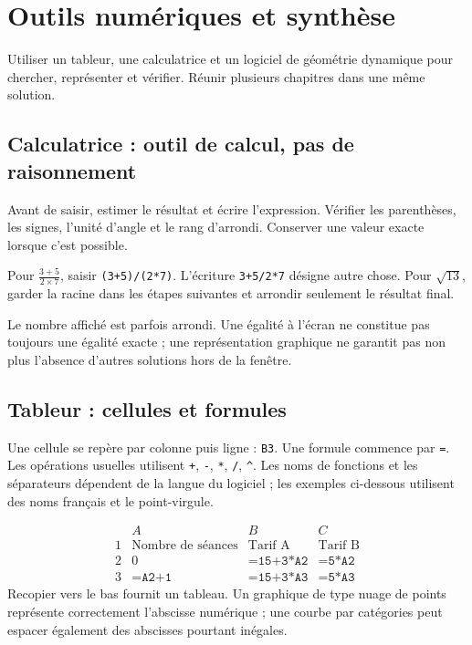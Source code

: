 \documentclass[../cours_3e.tex]{subfiles}
\begin{document}
\setcounter{chapter}{19}
\chapter{Outils numériques et synthèse}
\label{ch:outils}
\begin{objectif}
Utiliser un tableur, une calculatrice et un logiciel de géométrie dynamique pour chercher, représenter et vérifier. Réunir plusieurs chapitres dans une même solution.
\end{objectif}
\section{Calculatrice : outil de calcul, pas de raisonnement}
Avant de saisir, estimer le résultat et écrire l'expression. Vérifier les parenthèses, les signes, l'unité d'angle et le rang d'arrondi. Conserver une valeur exacte lorsque c'est possible.
\begin{exemple}
Pour $\frac{3+5}{2\times7}$, saisir \texttt{(3+5)/(2*7)}. L'écriture \texttt{3+5/2*7} désigne autre chose. Pour $\sqrt{13}$, garder la racine dans les étapes suivantes et arrondir seulement le résultat final.
\end{exemple}
Le nombre affiché est parfois arrondi. Une égalité à l'écran ne constitue pas toujours une égalité exacte ; une représentation graphique ne garantit pas non plus l'absence d'autres solutions hors de la fenêtre.
\section{Tableur : cellules et formules}
Une cellule se repère par colonne puis ligne : \texttt{B3}. Une formule commence par \texttt{=}. Les opérations usuelles utilisent \texttt{+}, \texttt{-}, \texttt{*}, \texttt{/}, \texttt{\^}. Les noms de fonctions et les séparateurs dépendent de la langue du logiciel ; les exemples ci-dessous utilisent des noms français et le point-virgule.
\begin{exemple}
\[
\begin{array}{c|lll}
&A&B&C\\\hline
1&\text{Nombre de séances}&\text{Tarif A}&\text{Tarif B}\\
2&0&\texttt{=15+3*A2}&\texttt{=5*A2}\\
3&\texttt{=A2+1}&\texttt{=15+3*A3}&\texttt{=5*A3}
\end{array}
\]
Recopier vers le bas fournit un tableau. Un graphique de type nuage de points représente correctement l'abscisse numérique ; une courbe par catégories peut espacer également des abscisses pourtant inégales.
\end{exemple}
\end{document}

